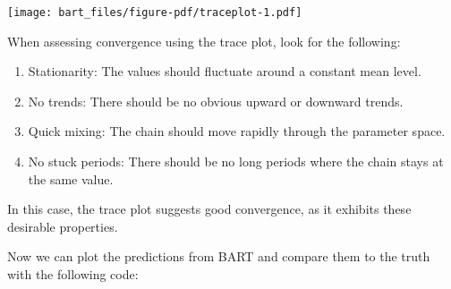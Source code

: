 \documentclass[
  letterpaper,
  DIV=11,
  numbers=noendperiod]{scrreprt}
\providecommand{\tightlist}{%
  \setlength{\itemsep}{0pt}\setlength{\parskip}{0pt}}\usepackage{longtable,booktabs,array}
\begin{document}
\texttt{[image: bart\_files/figure-pdf/traceplot-1.pdf]}

When assessing convergence using the trace plot, look for the following:

\begin{enumerate}
\def\labelenumi{\arabic{enumi}.}
\tightlist
\item
  Stationarity: The values should fluctuate around a constant mean
  level.
\item
  No trends: There should be no obvious upward or downward trends.
\item
  Quick mixing: The chain should move rapidly through the parameter
  space.
\item
  No stuck periods: There should be no long periods where the chain
  stays at the same value.
\end{enumerate}

In this case, the trace plot suggests good convergence, as it exhibits
these desirable properties.

Now we can plot the predictions from BART and compare them to the truth
with the following code:
\end{document}
